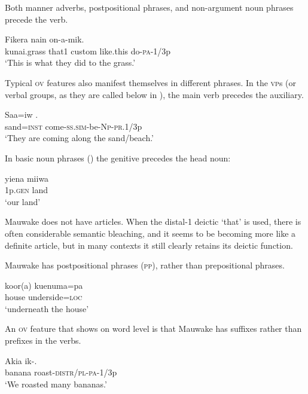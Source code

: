 Both manner adverbs, postpositional phrases, and non-argument noun phrases precede the verb.

\ea%
\label{ex:1:x678}
\gll Fikera  nain     on-a-mik. \\
  kunai.grass  that1  custom  like.this  do-\textsc{pa}-1/3p    \\
\glt `This is what they did to the  grass.'
\z


Typical \textsc{ov} features also manifest themselves in different phrases. In the \textsc{vp}s (or verbal groups, as they are called below in ), the main verb precedes the auxiliary.

\ea%
\label{ex:1:x679}
\gll Saa=iw . \\
 sand=\textsc{inst}  come-\textsc{ss}.\textsc{sim}-be-\textsc{Np}-\textsc{pr}.1/3p     \\
\glt`They are coming along the sand/beach.'
\z


In basic noun phrases () the genitive precedes the head noun:

\ea%
\label{ex:1:x680}
\gll yiena  miiwa \\
 1p.\textsc{gen}  land     \\
\glt`our land'
\z


Mauwake does not have articles. When the distal-1 deictic  `that' is used,  there is often considerable semantic bleaching, and it seems to be becoming more like a definite article, but in many contexts it still clearly retains its deictic function.  

Mauwake has postpositional phrases (\textsc{pp}), rather than prepositional phrases.

\ea%
\label{ex:1:x681}
\gll koor(a)  kuenuma=pa \\
 house  underside=\textsc{loc}     \\
\glt`underneath the house'
\z


An \textsc{ov} feature that shows on word level is that Mauwake has suffixes rather than prefixes in the verbs.

\ea%
\label{ex:1:x682}
\gll Akia  ik-. \\
 banana  roast-\textsc{distr}/\textsc{pl}-\textsc{pa}-1/3p     \\
\glt`We roasted many bananas.'
\z


